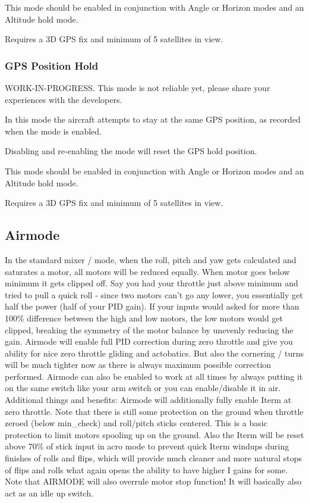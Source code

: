 This mode should be enabled in conjunction with Angle or Horizon modes and an Altitude hold mode.

Requires a 3\+D G\+P\+S fix and minimum of 5 satellites in view.

\subsubsection*{G\+P\+S Position Hold}

W\+O\+R\+K-\/\+I\+N-\/\+P\+R\+O\+G\+R\+E\+S\+S. This mode is not reliable yet, please share your experiences with the developers.

In this mode the aircraft attempts to stay at the same G\+P\+S position, as recorded when the mode is enabled.

Disabling and re-\/enabling the mode will reset the G\+P\+S hold position.

This mode should be enabled in conjunction with Angle or Horizon modes and an Altitude hold mode.

Requires a 3\+D G\+P\+S fix and minimum of 5 satellites in view.

\subsection*{Airmode}

In the standard mixer / mode, when the roll, pitch and yaw gets calculated and saturates a motor, all motors will be reduced equally. When motor goes below minimum it gets clipped off. Say you had your throttle just above minimum and tried to pull a quick roll -\/ since two motors can't go any lower, you essentially get half the power (half of your P\+I\+D gain). If your inputs would asked for more than 100\% difference between the high and low motors, the low motors would get clipped, breaking the symmetry of the motor balance by unevenly reducing the gain. Airmode will enable full P\+I\+D correction during zero throttle and give you ability for nice zero throttle gliding and actobatics. But also the cornering / turns will be much tighter now as there is always maximum possible correction performed. Airmode can also be enabled to work at all times by always putting it on the same switch like your arm switch or you can enable/disable it in air. Additional things and benefits\+: Airmode will additionally fully enable Iterm at zero throttle. Note that there is still some protection on the ground when throttle zeroed (below min\+\_\+check) and roll/pitch sticks centered. This is a basic protection to limit motors spooling up on the ground. Also the Iterm will be reset above 70\% of stick input in acro mode to prevent quick Iterm windups during finishes of rolls and flips, which will provide much cleaner and more natural stops of flips and rolls what again opens the ability to have higher I gains for some. Note that A\+I\+R\+M\+O\+D\+E will also overrule motor stop function! It will basically also act as an idle up switch.

